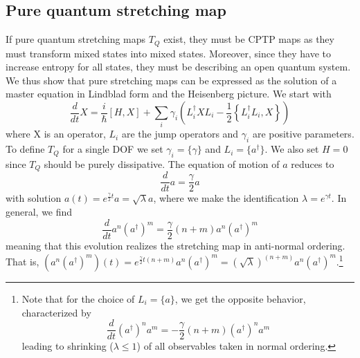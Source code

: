 \documentclass{article}
\begin{document}
\subsection{Pure quantum stretching map}

If pure quantum stretching maps $T_Q$ exist, they must be CPTP maps as they must transform mixed states into mixed states. Moreover, since they have to increase entropy for all states, they must be describing an open quantum system. We thus show that pure stretching maps can be expressed as the solution of a master equation in Lindblad form and the Heisenberg picture. We start with
\begin{equation}
	\frac{d}{d t} X=\frac{i}{\hbar}[H,X]+\sum_i \gamma_i \left(L_i^\dagger X L_i-\frac{1}{2}\left\{L_i^\dagger L_i,X\right\}\right)
\end{equation}
where X is an operator, $L_i$ are the jump operators and $\gamma_i$ are positive parameters. To define $T_Q$ for a single DOF we set $\gamma_i=\{\gamma\}$ and $L_i=\{a^\dagger\}$. We also set $H=0$ since $T_Q$ should be purely dissipative. The equation of motion of $a$ reduces to
\begin{equation}
	\frac{d}{d t} a=\frac{\gamma}{2} a
\end{equation}
with solution $a(t)=e^{\frac{\gamma}{2} t} a = \sqrt{\lambda} a$, where we make the identification $\lambda=e^{\gamma t}$. 
In general, we find
\begin{equation}
	\frac{d}{d t} a^n (a^{\dagger})^m=\frac{\gamma}{2}(n+m)a^n (a^{\dagger})^m
\end{equation}
meaning that this evolution realizes the stretching map in anti-normal ordering. That is, $(a^n (a^{\dagger})^m)(t)=e^{\frac{\gamma}{2} t (n+m)} a^n (a^{\dagger})^m = (\sqrt{\lambda})^{(n+m)} a^n (a^{\dagger})^m$.\footnote{Note that for the choice of $L_i=\{a\}$, we get the opposite behavior, characterized by
\begin{equation}
	\frac{d}{d t} (a^{\dagger})^n a^m=-\frac{\gamma}{2}(n+m)(a^{\dagger})^n a^m
\end{equation}
leading to shrinking ($\lambda\leq1$) of all observables taken in normal ordering.}
\end{document}
